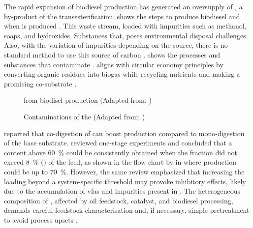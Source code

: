 \documentclass[12pt, a4paper, oneside]{report}
\begin{document}
The rapid expansion of biodiesel production has generated an oversupply of , a by-product of the transesterification.  shows the steps to produce biodiesel and when  is produced \parencite{garlapati2016}. This waste stream, loaded with impurities such as methanol, soaps, and hydroxides. Substances that, poses environmental disposal challenges. Also, with the variation of impurities depending on the source, there is no standard method to use this source of carbon \parencite{anand2012, gebreegziabher2025}.  shows the processes and substances that contaminate .  aligns with circular economy principles by converting organic residues into biogas while recycling nutrients and making  a promising co-substrate \parencite{gebreegziabher2025}.

\begin{figure}[H]
    \centering
    \resizebox{0.65\textwidth}{!}{
    }
    \caption{ from biodisel production (Adapted from: \textcite{garlapati2016})}
    \label{graph:gl-prod}
\end{figure}

\begin{figure}[H]
    \centering
    \resizebox{\textwidth}{!}{
    }
    \caption{Contaminations of the  (Adapted from: \textcite{attarbachi2023})}
    \label{graph:gl-imp}
\end{figure}

\textcite{gebreegziabher2025} reported that co-digestion of  can boost  production compared to mono-digestion of the base substrate. \textcite{tomczak2025} reviewed one-stage  experiments and concluded that a  content above \qty{60}{\percent} could be consistently obtained when the  fraction did not exceed \qty{8}{\percent} () of the feed, as shown in the flow chart by \textcite{li2011} in  where  production could be up to \qty{70}{\percent}. However, the same review emphasized that increasing the  loading beyond a system-specific threshold may provoke inhibitory effects, likely due to the accumulation of \glspl{vfa} and impurities present in  \parencite{anand2012, tomczak2025}. The heterogeneous composition of , affected by oil feedstock, catalyst, and biodiesel processing, demands careful feedstock characterisation and, if necessary, simple pretreatment to avoid process upsets \parencite{attarbachi2023}.
\end{document}

